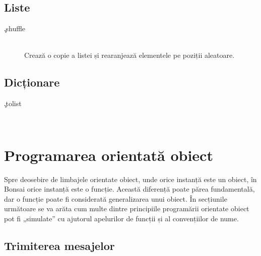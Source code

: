 \documentclass[12pt,a4paper]{memoir}
\begin{document}
\section{Liste}

\begin{description}
\item[\c{.shuffle}]\hfill\\Crează o copie a listei și rearanjează elementele pe poziții aleatoare.
\end{description}


\section{Dicționare}

\begin{description}
\item[\c{.tolist}]\hfill\\
\end{description}


\chapter{Programarea orientată obiect}\label{ch:oop}

Spre deosebire de limbajele orientate obiect, unde orice instanță este un obiect, în Bonsai orice instanță este o funcție. Această diferență poate părea fundamentală, dar o funcție poate fi considerată generalizarea unui obiect. În secțiunile următoare se va arăta cum multe dintre principiile programării orientate obiect pot fi „simulate” cu ajutorul apelurilor de funcții și al convențiilor de nume.

\section{Trimiterea mesajelor}
\end{document}
